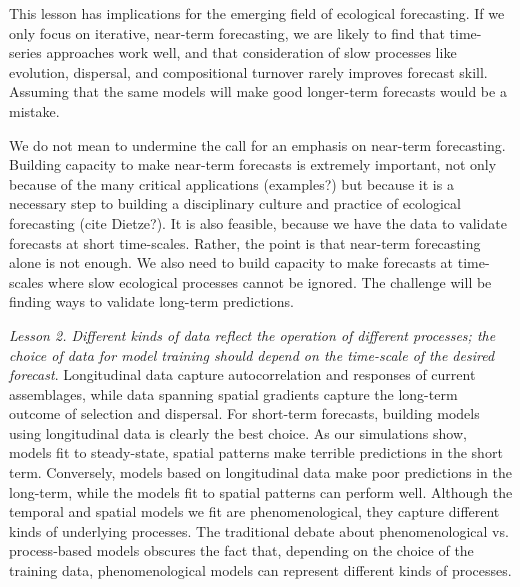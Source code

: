 \documentclass[11pt]{article}
\begin{document}
This lesson has implications for the emerging field of ecological forecasting. If we only focus on iterative, near-term forecasting, we are likely to find 
that time-series approaches work well, and that consideration of slow processes like evolution, dispersal, and compositional turnover rarely improves
forecast skill. Assuming that the same models will make good longer-term forecasts would be a mistake.

We do not mean to undermine the call for an emphasis on near-term forecasting. Building capacity to make near-term forecasts is extremely important, not
only because of the many critical applications (examples?) but because it is a necessary step to building a disciplinary culture and practice of ecological 
forecasting (cite Dietze?). It is also feasible, because we have the data to validate forecasts at short time-scales. Rather, the point is that near-term forecasting
alone is not enough. We also need to build capacity to make forecasts at time-scales where slow ecological processes cannot be ignored. The challenge 
will be finding ways to validate long-term predictions. 

\emph{Lesson 2. Different kinds of data reflect the operation of different processes; the choice of data for model training should depend on the time-scale of the desired forecast}.
Longitudinal data capture autocorrelation and responses of current assemblages, while data spanning spatial gradients capture the long-term outcome of 
selection and dispersal. For short-term forecasts, building models using longitudinal data is clearly the best choice. As our simulations show, models fit to 
steady-state, spatial patterns make terrible predictions in the short term. Conversely, models based on longitudinal data make poor predictions in the long-term,
while the models fit to spatial patterns can perform well. Although the temporal and spatial models we fit are phenomenological, they capture different kinds
 of underlying processes. The traditional debate about phenomenological vs. process-based models obscures the fact that, depending on the choice of the
 training data, phenomenological models can represent different kinds of processes.
 
\end{document}
